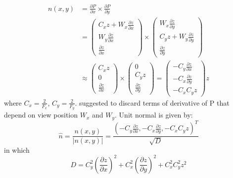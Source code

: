 \begin{align} \label{eq:surface_normal}
n(x, y) &=  \frac{\partial P}{\partial x} \times \frac{\partial P}{\partial y}  \nonumber \\
	&= 
		\begin{pmatrix} 
			C_x z  + W_x \frac{\partial z}{\partial x} \\
			W_y \frac{\partial z}{\partial x} \\
			\frac{\partial z}{\partial x}
		\end{pmatrix}
		\times
		\begin{pmatrix} 
			W_x \frac{\partial z}{\partial y} \\
			C_y z  + W_y \frac{\partial z}{\partial y} \\
			\frac{\partial z}{\partial y}
		\end{pmatrix} \nonumber \\		
	&\approx
		\begin{pmatrix}
			C_x z \\
			0 \\
			\frac{\partial z}{\partial x}
		\end{pmatrix}
		\times
		\begin{pmatrix}
			0 \\
			C_y z \\
			\frac{\partial z}{\partial y}
		\end{pmatrix}
		=
		\begin{pmatrix}
			-C_y \frac{\partial z}{\partial x} \\
			-C_x \frac{\partial z}{\partial y} \\
			-C_x  C_y z 
		\end{pmatrix} z
\end{align}
where $C_x = \frac{2}{F_x}$, $C_y = \frac{2}{F_y}$. \cite{laanSainz2009} suggested to discard terms of derivative of P that depend on view position $W_x$ and $W_y$. Unit normal is given by:
\begin{equation} \label{eq:view_space_normal}
	\hat{n} = \frac{n(x, y)}{|n(x, y)|} = \frac{\left(-C_y \frac{\partial z}{\partial x}, -C_x \frac{\partial z}{\partial y}, -C_x  C_y z\right)^T}{\sqrt{D}}
\end{equation}
in which
\begin{equation}
D = C^2_y \left(\frac{\partial z}{\partial x}\right)^2 + C^2_x \left(\frac{\partial z}{\partial y}\right)^2 + C^2_x  C^2_y z^2 
\end{equation}

